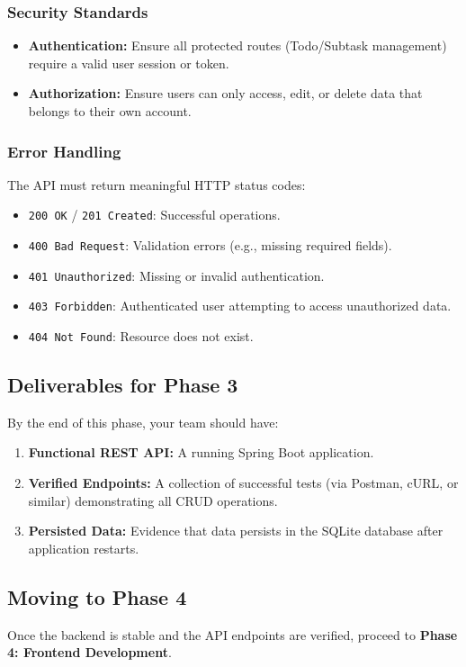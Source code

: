 \subsubsection{Security Standards}
\begin{itemize}
  \item \textbf{Authentication:} Ensure all protected routes (Todo/Subtask management) require a valid user session or token.
  \item \textbf{Authorization:} Ensure users can only access, edit, or delete data that belongs to their own account.
\end{itemize}

\subsubsection{Error Handling}
The API must return meaningful HTTP status codes:
\begin{itemize}
  \item \texttt{200 OK} / \texttt{201 Created}: Successful operations.
  \item \texttt{400 Bad Request}: Validation errors (e.g., missing required fields).
  \item \texttt{401 Unauthorized}: Missing or invalid authentication.
  \item \texttt{403 Forbidden}: Authenticated user attempting to access unauthorized data.
  \item \texttt{404 Not Found}: Resource does not exist.
\end{itemize}

\subsection{Deliverables for Phase 3}
By the end of this phase, your team should have:
\begin{enumerate}
  \item \textbf{Functional REST API:} A running Spring Boot application.
  \item \textbf{Verified Endpoints:} A collection of successful tests (via Postman, cURL, or similar) demonstrating all CRUD operations.
  \item \textbf{Persisted Data:} Evidence that data persists in the SQLite database after application restarts.
\end{enumerate}

\subsection{Moving to Phase 4}
Once the backend is stable and the API endpoints are verified,
proceed to \textbf{Phase 4: Frontend Development}.

